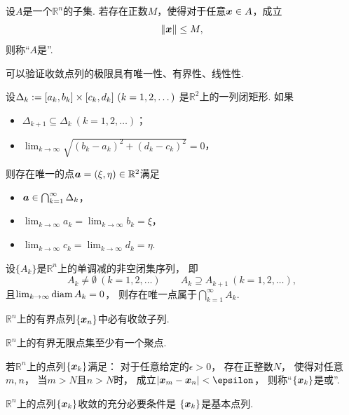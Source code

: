 \begin{definition}
设\(A\)是一个\(\mathbb{R}^n\)的子集.
若存在正数\(M\)，使得对于任意\(\boldsymbol{x} \in A\)，成立\begin{equation*}
	\norm{\boldsymbol{x}} \leq M,
\end{equation*}
则称“\(A\)是”.
\end{definition}
可以验证收敛点列的极限具有唯一性、有界性、线性性.

\begin{theorem}[闭矩形套定理]
设\(\Delta_k := [a_k,b_k]\times[c_k,d_k]\ (k=1,2,\dotsc)\)
是\(\mathbb{R}^2\)上的一列闭矩形.
如果\begin{itemize}
	\item \(\Delta_{k+1} \subseteq \Delta_k\ (k=1,2,\dotsc)\)；
	\item \(\lim_{k\to\infty} \sqrt{(b_k-a_k)^2+(d_k-c_k)^2} = 0\)，
\end{itemize}
则存在唯一的点\(\boldsymbol{a}=(\xi,\eta)\in\mathbb{R}^2\)满足\begin{itemize}
	\item \(\boldsymbol{a}\in\bigcap_{k=1}^\infty \Delta_k\)，
	\item \(\lim_{k\to\infty} a_k = \lim_{k\to\infty} b_k = \xi\)，
	\item \(\lim_{k\to\infty} c_k = \lim_{k\to\infty} d_k = \eta\).
\end{itemize}
\end{theorem}
\begin{theorem}
设\(\{A_k\}\)是\(\mathbb{R}^n\)上的单调减的非空闭集序列，
即\begin{equation*}
	A_k\neq\emptyset\ (k=1,2,\dotsc)
	\qquad
	A_k \supseteq A_{k+1}\ (k=1,2,\dotsc),
\end{equation*}
且\(\lim_{k\to\infty} \operatorname{diam} A_k = 0\)，
则存在唯一点属于\(\bigcap_{k=1}^\infty A_k\).
\end{theorem}

\begin{theorem}
\(\mathbb{R}^n\)上的有界点列\(\{\boldsymbol{x}_n\}\)中必有收敛子列.
\end{theorem}
\begin{corollary}
\(\mathbb{R}^n\)上的有界无限点集至少有一个聚点.
\end{corollary}
\begin{definition}
若\(\mathbb{R}^n\)上的点列\(\{\boldsymbol{x}_k\}\)满足：
对于任意给定的\(\epsilon>0\)，
存在正整数\(N\)，
使得对任意\(m,n\)，
当\(m>N\)且\(n>N\)时，
成立\(\VectorLengthA{\vb{x}_m-\vb{x}_n}<\epsilon\)，
则称“\(\{\boldsymbol{x}_k\}\)是或”.
\end{definition}
\begin{theorem}
\(\mathbb{R}^n\)上的点列\(\{\boldsymbol{x}_k\}\)收敛的充分必要条件是
\(\{\boldsymbol{x}_k\}\)是基本点列.
\end{theorem}

